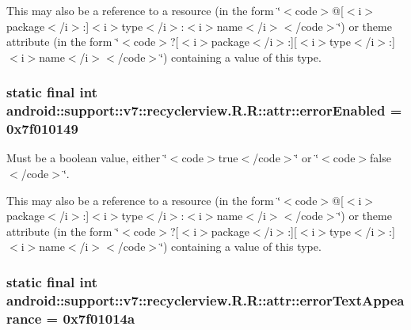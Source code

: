 This may also be a reference to a resource (in the form \char`\"{}$<$code$>$@\mbox{[}$<$i$>$package$<$/i$>$:\mbox{]}$<$i$>$type$<$/i$>$:$<$i$>$name$<$/i$>$$<$/code$>$\char`\"{}) or theme attribute (in the form \char`\"{}$<$code$>$?\mbox{[}$<$i$>$package$<$/i$>$:\mbox{]}\mbox{[}$<$i$>$type$<$/i$>$:\mbox{]}$<$i$>$name$<$/i$>$$<$/code$>$\char`\"{}) containing a value of this type. \hypertarget{classandroid_1_1support_1_1v7_1_1recyclerview_1_1_r_1_1attr_e6b3a2e39988b34541dc5b3c489bb50a}{
\subsubsection[{errorEnabled}]{\setlength{\rightskip}{0pt plus 5cm}static final int android::support::v7::recyclerview.R.R::attr::errorEnabled = 0x7f010149}}
\label{classandroid_1_1support_1_1v7_1_1recyclerview_1_1_r_1_1attr_e6b3a2e39988b34541dc5b3c489bb50a}


Must be a boolean value, either \char`\"{}$<$code$>$true$<$/code$>$\char`\"{} or \char`\"{}$<$code$>$false$<$/code$>$\char`\"{}. 

This may also be a reference to a resource (in the form \char`\"{}$<$code$>$@\mbox{[}$<$i$>$package$<$/i$>$:\mbox{]}$<$i$>$type$<$/i$>$:$<$i$>$name$<$/i$>$$<$/code$>$\char`\"{}) or theme attribute (in the form \char`\"{}$<$code$>$?\mbox{[}$<$i$>$package$<$/i$>$:\mbox{]}\mbox{[}$<$i$>$type$<$/i$>$:\mbox{]}$<$i$>$name$<$/i$>$$<$/code$>$\char`\"{}) containing a value of this type. \hypertarget{classandroid_1_1support_1_1v7_1_1recyclerview_1_1_r_1_1attr_3446bf67ad6915a18e83546db5f21921}{
\subsubsection[{errorTextAppearance}]{\setlength{\rightskip}{0pt plus 5cm}static final int android::support::v7::recyclerview.R.R::attr::errorTextAppearance = 0x7f01014a}}
\label{classandroid_1_1support_1_1v7_1_1recyclerview_1_1_r_1_1attr_3446bf67ad6915a18e83546db5f21921}


